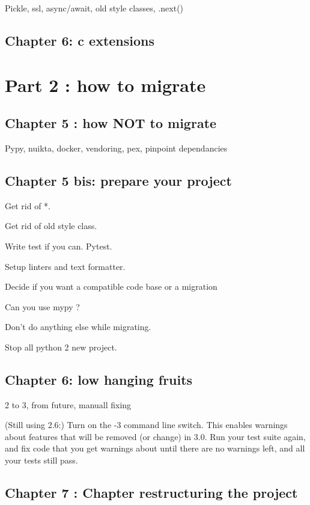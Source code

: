\documentclass[paperwidth=8in, paperheight=10in,lang=en]{elegantbook}
\begin{document}
Pickle, ssl, async/await, old style classes, .next()

\chapter{Chapter 6:  c extensions}

\part{Part 2 : how to migrate}

\chapter{Chapter 5 : how NOT to migrate}

Pypy, nuikta, docker, vendoring, pex, pinpoint dependancies

\chapter{Chapter 5 bis: prepare your project}

Get rid of *.

Get rid of old style class.

Write test if you can. Pytest.

Setup linters and text formatter.

Decide if you want a compatible code base or a migration

Can you use mypy ?

Don't do anything else while migrating.

Stop all python 2 new project.

\chapter{Chapter 6: low hanging fruits}

2 to 3, from future, manuall fixing

(Still using 2.6:) Turn on the -3 command line switch. This enables warnings about features that will be removed (or change) in 3.0. Run your test suite again, and fix code that you get warnings about until there are no warnings left, and all your tests still pass.

\chapter{Chapter 7 : Chapter restructuring the project}
\end{document}
